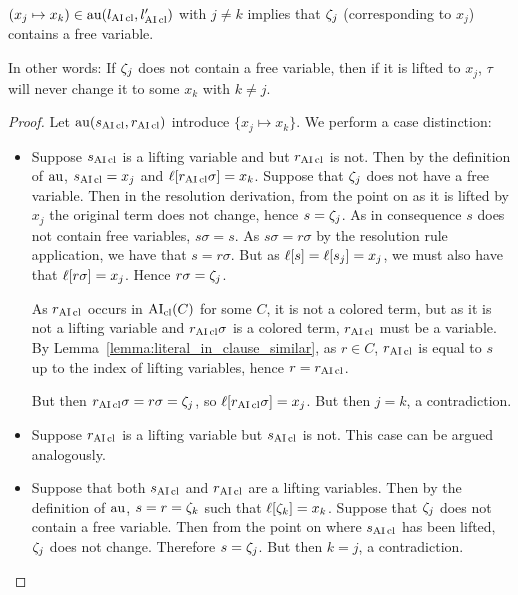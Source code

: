 \documentclass[,%
	paper=a4,%
	DIV12, %
	twoside=false,%
	liststotoc,
	bibtotoc,
	draft=false,%
	numbers=noendperiod
]{scrartcl}
\begin{document}
\begin{lemma}
	\label{lemma:tau_only_for_variable_terms}
	$(x_j \mapsto x_k) \in \operatorname{au}(l_{\operatorname{AI}\mathrm{cl}}, l_{\operatorname{AI}\mathrm{cl}}')$ with $j\neq k$ implies that $\zeta_{j}$ (corresponding to $x_j$) contains a free variable.

	In other words: If $\zeta_{j}$ does not contain a free variable, then if it is lifted to $x_j$, $\tau$ will never change it to some $x_k$ with $k\neq j$.
\end{lemma}
\begin{proof}
	Let  $\operatorname{au}(s_{\operatorname{AI}\mathrm{cl}}, r_{\operatorname{AI}\mathrm{cl}})$ introduce $\{x_j \mapsto x_k\}$.
	We perform a case distinction:
	\begin{itemize}
		\item Suppose $s_{\operatorname{AI}\mathrm{cl}}$ is a lifting variable and but $r_{\operatorname{AI}\mathrm{cl}}$ is not.
			Then by the definition of $\operatorname{au}$, $s_{\operatorname{AI}\mathrm{cl}} = x_j$ and $\ell[r_{\operatorname{AI}\mathrm{cl}}\sigma] = x_k$.
			Suppose that $\zeta_{j}$ does not have a free variable.
			Then in the resolution derivation, from the point on as it is lifted by $x_j$ the original term does not change, hence $s = \zeta_{j}$. As in consequence $s$ does not contain free variables, $s\sigma = s$.
			As $s\sigma = r\sigma$ by the resolution rule application, we have that $s = r\sigma$.
			But as $\ell[s] = \ell[s_j] = x_j$, we must also have that $\ell[r\sigma] = x_j$.
			Hence $r\sigma = \zeta_{j}$.

			As $r_{\operatorname{AI}\mathrm{cl}}$ occurs in $\operatorname{AI}_\mathrm{cl}(C)$ for some $C$, it is not a colored term, but as it is not a lifting variable and $r_{\operatorname{AI}\mathrm{cl}}\sigma$ is a colored term, $r_{\operatorname{AI}\mathrm{cl}}$ must be a variable.
			By Lemma~\ref{lemma:literal_in_clause_similar}, as $r \in C$, $r_{\operatorname{AI}\mathrm{cl}}$ is equal to $s$ up to the index of lifting variables, hence $r = r_{\operatorname{AI}\mathrm{cl}}$.

			But then $r_{\operatorname{AI}\mathrm{cl}}\sigma = r\sigma = \zeta_{j}$, so $\ell[r_{\operatorname{AI}\mathrm{cl}}\sigma] = x_j$. But then $j=k$, a contradiction.

		\item Suppose $r_{\operatorname{AI}\mathrm{cl}}$ is a lifting variable but $s_{\operatorname{AI}\mathrm{cl}}$ is not. This case can be argued analogously.

		\item Suppose that both $s_{\operatorname{AI}\mathrm{cl}}$ and $r_{\operatorname{AI}\mathrm{cl}}$ are a lifting variables.
			Then by the definition of $\operatorname{au}$, $s = r = \zeta_{k}$ such that $\ell[\zeta_{k}] = x_k$.
			Suppose that $\zeta_{j}$ does not contain a free variable. Then from the point on where $s_{\operatorname{AI}\mathrm{cl}}$ has been lifted, $\zeta_{j}$ does not change. Therefore $s = \zeta_{j}$. But then $k=j$, a contradiction.
			\qedhere
	\end{itemize}
\end{proof}
\end{document}
